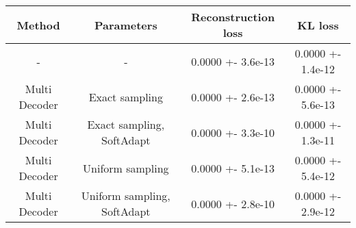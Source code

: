 \centering
\scriptsize
\begin{tabular}{||c|c|c|c||}
\hline
 Method & Parameters & Reconstruction loss & KL loss \\
\hline
- & - & 0.0000 +- 3.6e-13 & 0.0000 +- 1.4e-12 \\
\hline
Multi Decoder & Exact sampling & 0.0000 +- 2.6e-13 & 0.0000 +- 5.6e-13 \\
\hline
Multi Decoder & Exact sampling, SoftAdapt & 0.0000 +- 3.3e-10 & 0.0000 +- 1.3e-11 \\
\hline
Multi Decoder & Uniform sampling & 0.0000 +- 5.1e-13 & 0.0000 +- 5.4e-12 \\
\hline
Multi Decoder & Uniform sampling, SoftAdapt & 0.0000 +- 2.8e-10 & 0.0000 +- 2.9e-12 \\
\hline
\end{tabular}
